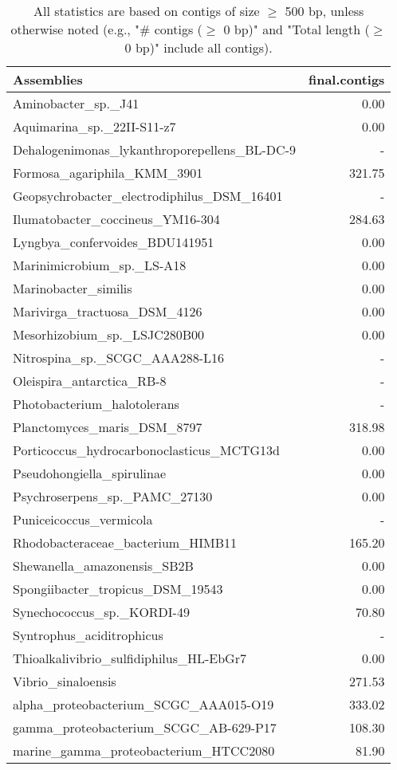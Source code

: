 \documentclass[12pt,a4paper]{article}
\begin{document}
\begin{table}[ht]
\begin{center}
\caption{All statistics are based on contigs of size $\geq$ 500 bp, unless otherwise noted (e.g., "\# contigs ($\geq$ 0 bp)" and "Total length ($\geq$ 0 bp)" include all contigs).}
\begin{tabular}{|l*{1}{|r}|}
\hline
Assemblies & final.contigs \\ \hline
Aminobacter\_sp.\_J41 & 0.00 \\ \hline
Aquimarina\_sp.\_22II-S11-z7 & 0.00 \\ \hline
Dehalogenimonas\_lykanthroporepellens\_BL-DC-9 & - \\ \hline
Formosa\_agariphila\_KMM\_3901 & 321.75 \\ \hline
Geopsychrobacter\_electrodiphilus\_DSM\_16401 & - \\ \hline
Ilumatobacter\_coccineus\_YM16-304 & 284.63 \\ \hline
Lyngbya\_confervoides\_BDU141951 & 0.00 \\ \hline
Marinimicrobium\_sp.\_LS-A18 & 0.00 \\ \hline
Marinobacter\_similis & 0.00 \\ \hline
Marivirga\_tractuosa\_DSM\_4126 & 0.00 \\ \hline
Mesorhizobium\_sp.\_LSJC280B00 & 0.00 \\ \hline
Nitrospina\_sp.\_SCGC\_AAA288-L16 & - \\ \hline
Oleispira\_antarctica\_RB-8 & - \\ \hline
Photobacterium\_halotolerans & - \\ \hline
Planctomyces\_maris\_DSM\_8797 & 318.98 \\ \hline
Porticoccus\_hydrocarbonoclasticus\_MCTG13d & 0.00 \\ \hline
Pseudohongiella\_spirulinae & 0.00 \\ \hline
Psychroserpens\_sp.\_PAMC\_27130 & 0.00 \\ \hline
Puniceicoccus\_vermicola & - \\ \hline
Rhodobacteraceae\_bacterium\_HIMB11 & 165.20 \\ \hline
Shewanella\_amazonensis\_SB2B & 0.00 \\ \hline
Spongiibacter\_tropicus\_DSM\_19543 & 0.00 \\ \hline
Synechococcus\_sp.\_KORDI-49 & 70.80 \\ \hline
Syntrophus\_aciditrophicus & - \\ \hline
Thioalkalivibrio\_sulfidiphilus\_HL-EbGr7 & 0.00 \\ \hline
Vibrio\_sinaloensis & 271.53 \\ \hline
alpha\_proteobacterium\_SCGC\_AAA015-O19 & 333.02 \\ \hline
gamma\_proteobacterium\_SCGC\_AB-629-P17 & 108.30 \\ \hline
marine\_gamma\_proteobacterium\_HTCC2080 & 81.90 \\ \hline
\end{tabular}
\end{center}
\end{table}
\end{document}
